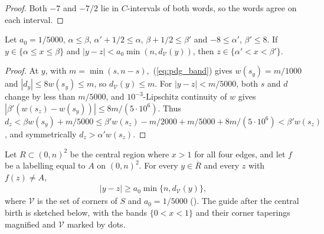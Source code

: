 \begin{proof}\leanok
    Both $-7$ and $-7/2$ lie in $C$-intervals of both words, so the words agree on
    each interval.
\end{proof}

\begin{lemma}
    \label{lem:peps_dyadic_conical_band}
    \leanok
    Let $a_0=1/5000$, $\alpha\le\beta$, $\alpha'+1/2\le\alpha$, $\beta+1/2\le\beta'$
    and $-8\le\alpha'$, $\beta'\le8$. If $y\in\{\alpha\le x\le\beta\}$ and
    $|y-z|<a_0\min(n,d_{\mathcal V}(y))$, then $z\in\{\alpha'<x<\beta'\}$.
\end{lemma}

\begin{proof}\leanok
    At $y$, with $m=\min(s,n-s)$,~(\ref{eq:pdg_band}) gives $w(s_y)=m/1000$ and
    $|d_y|\le8w(s_y)\le m$, so $d_{\mathcal V}(y)\le m$. For $|y-z|<m/5000$, both
    $s$ and $d$ change by less than $m/5000$, and $10^{-3}$-Lipschitz continuity
    of $w$ gives $|\beta'(w(s_z)-w(s_y))|\le8m/(5\cdot10^{6})$. Thus
    $d_z<\beta w(s_y)+m/5000\le\beta' w(s_z)-m/2000+m/5000+8m/(5\cdot10^6)<\beta'w(s_z)$,
    and symmetrically $d_z>\alpha'w(s_z)$.
\end{proof}

\begin{lemma}
    \label{thm:peps_dyadic_central_clearance}
    \leanok
    Let $R\subset(0,n)^2$ be the central region where $x>1$ for all four edges, and let
    $f$ be a labelling equal to $A$ on $(0,n)^2$. For every $y\in\overline R$ and
    every $z$ with $f(z)\ne A$,
    \begin{align}
        |y-z|\ge a_0\min\{n,d_{\mathcal V}(y)\},
        \label{eq:pdg_central}
    \end{align}
    where $\mathcal V$ is the set of corners of $S$ and $a_0=1/5000$
    (\cite[Lemma~7.2]{OpenAI2026PolynomialPEPS}).
    The guide after the central birth is sketched below, with the bands
    $\{0<x<1\}$ and their corner taperings magnified and $\mathcal V$ marked by dots.
    
\end{lemma}

